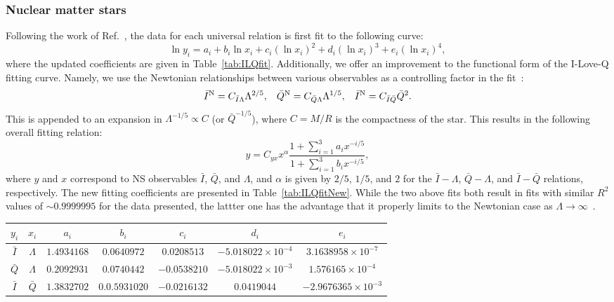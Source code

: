 \documentclass[prd,twocolumn,nofootinbib,superscriptaddress,amsmath,amssymb]{revtex4-1}
\begin{document}
\subsubsection{Nuclear matter stars}\label{sec:ilq-nuc}
Following the work of Ref.~\cite{Yagi:ILQ}, the data for each universal relation is first fit to the following curve:
\begin{equation}\label{eq:ILQfit}
\ln{y_i}=a_i+b_i \ln{x_i} + c_i (\ln{x_i})^2 + d_i (\ln{x_i})^3 + e_i (\ln{x_i})^4,
\end{equation}
where the updated coefficients are given in Table~\ref{tab:ILQfit}.
Additionally, we offer an improvement to the functional form of the I-Love-Q fitting curve. 
Namely, we use the Newtonian relationships between various observables as a controlling factor in the fit~\cite{Yagi:ILQ}:
\begin{equation}\label{eq:Newtonian}
\bar{I}^{\text{N}} = C_{\bar{I}\Lambda}\Lambda^{2/5}, \hspace{3mm} \bar{Q}^{\text{N}} = C_{\bar{Q}\Lambda}\Lambda^{1/5}, \hspace{3mm} \bar{I}^{\text{N}} = C_{\bar{I}\bar{Q}}\bar{Q}^{2}.
\end{equation}
This is appended to an expansion in $\Lambda^{-1/5} \propto C$ (or $\bar{Q}^{-1/5}$), where $C=M/R$ is the compactness of the star.
This results in the following overall fitting relation:
\begin{equation}\label{eq:ILQfitNew}
y=C_{yx} x^{\alpha} \frac{1+\sum_{i=1}^3 a_i x^{-i/5}}{1+\sum_{i=1}^3 b_i x^{-i/5}},
\end{equation}
where $y$ and $x$ correspond to NS observables $\bar{I}$, $\bar{Q}$, and $\Lambda$, and $\alpha$ is given by $2/5$, $1/5$, and $2$ for the $\bar{I}-\Lambda$, $\bar{Q}-\Lambda$, and $\bar{I}-\bar{Q}$ relations, respectively.
The new fitting coefficients are presented in Table~\ref{tab:ILQfitNew}.
While the two above fits both result in fits with similar $R^2$ values of $\sim 0.9999995$ for the data presented, the lattter one has the advantage that it properly limits to the Newtonian case as $\Lambda \rightarrow \infty$~\cite{Yagi:binLove}.

\begin{table*}
\centering
\caption{
Updated fit parameters for the I-Love-Q universal relations, fitted to the constrained EoS data by the curve found in Eq.~\ref{eq:ILQfit}.
}\label{tab:ILQfit}
\begin{tabular}{ c  c | c c c c c } 
 \hline
 \hline
 $y_i$ & $x_i$ & $a_i$ & $b_i$ & $c_i$ & $d_i$ & $e_i$ \\
 \hline
 $\bar{I}$ & $\Lambda$ & $1.4934168$ & $0.0640972$ & $0.0208513$ & $-5.018022 \times 10^{-4}$ & $3.1638958 \times 10^{-7}$ \\
 $\bar{Q}$ & $\Lambda$ & $0.2092931$ & $0.0740442$ & $-0.0538210$ & $-5.018022 \times 10^{-3}$ & $1.576165 \times 10^{-4}$ \\ 
  $\bar{I}$ & $\bar{Q}$ & $1.3832702$ & $0.0.5931020$ & $-0.0216132$ & $0.0419044$ & $-2.9676365 \times 10^{-3}$ \\
 \hline
 \hline
\end{tabular}
\end{table*}
\end{document}
